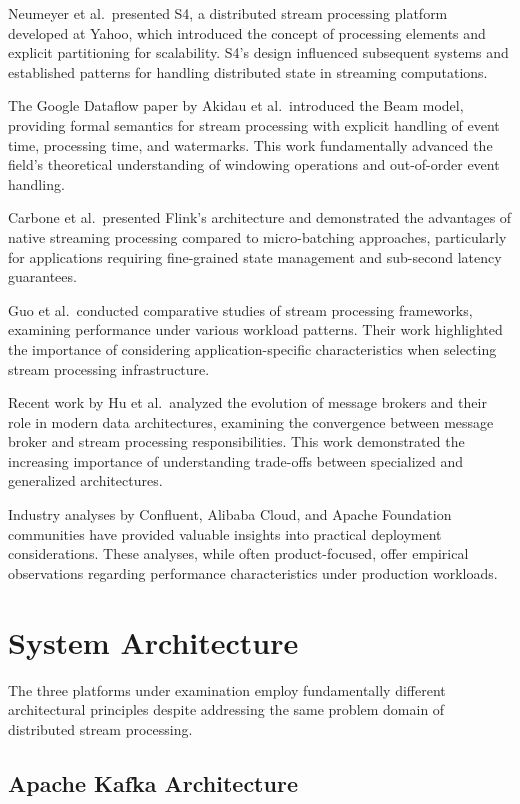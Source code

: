 \documentclass[10pt,twocolumn]{article}
\begin{document}
Neumeyer et al.\ presented S4, a distributed stream processing platform developed at Yahoo, which introduced the concept of processing elements and explicit partitioning for scalability. S4's design influenced subsequent systems and established patterns for handling distributed state in streaming computations.

The Google Dataflow paper by Akidau et al.\ introduced the Beam model, providing formal semantics for stream processing with explicit handling of event time, processing time, and watermarks. This work fundamentally advanced the field's theoretical understanding of windowing operations and out-of-order event handling.

Carbone et al.\ presented Flink's architecture and demonstrated the advantages of native streaming processing compared to micro-batching approaches, particularly for applications requiring fine-grained state management and sub-second latency guarantees.

Guo et al.\ conducted comparative studies of stream processing frameworks, examining performance under various workload patterns. Their work highlighted the importance of considering application-specific characteristics when selecting stream processing infrastructure.

Recent work by Hu et al.\ analyzed the evolution of message brokers and their role in modern data architectures, examining the convergence between message broker and stream processing responsibilities. This work demonstrated the increasing importance of understanding trade-offs between specialized and generalized architectures.

Industry analyses by Confluent, Alibaba Cloud, and Apache Foundation communities have provided valuable insights into practical deployment considerations. These analyses, while often product-focused, offer empirical observations regarding performance characteristics under production workloads.

\section{System Architecture}

The three platforms under examination employ fundamentally different architectural principles despite addressing the same problem domain of distributed stream processing.

\subsection{Apache Kafka Architecture}
\end{document}
